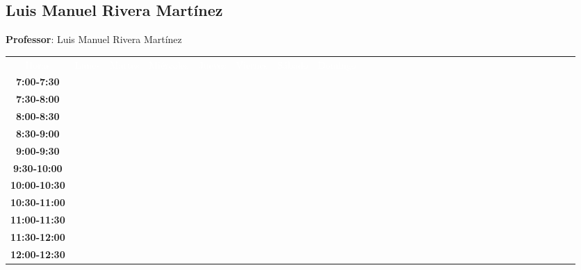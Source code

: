 \documentclass{article}
\begin{document}
        \newpage
        

        \subsection{Luis Manuel Rivera Mart\'inez}
        \vspace*{.1cm}
        
        \begin{flushright}
            {\LARGE \textbf{Professor}: Luis Manuel Rivera Mart\'inez}
        \end{flushright}
        \vspace{1cm}

        \begin{table}[ht]\centering\small\begin{tabular}{|c|c|c|c|c|c|c|c|c|c|c|c|c|c|c|c|c|c|c|c|c|c|c|c|c|c|c|c|c|c|}\hline\cellcolor{black}\textcolor{white}{Horas} & \cellcolor{black}\textcolor{white}{Lunes} & \cellcolor{black}\textcolor{white}{Martes} & \cellcolor{black}\textcolor{white}{Mi\'ercoles} & \cellcolor{black}\textcolor{white}{Jueves} & \cellcolor{black}\textcolor{white}{Viernes} & \cellcolor{black}\textcolor{white}{S\'abado} & \cellcolor{black}\textcolor{white}{Domingo} \\
 \cline{1-8} 
\textbf{7:00-7:30} &   &   &   &   &   &   &   \\
 \cline{1-8} 
\textbf{7:30-8:00} &   &   &   &   &   &   &   \\
 \cline{1-8} 
\textbf{8:00-8:30} &   &   &   &   &   &   &   \\
 \cline{1-8} 
\textbf{8:30-9:00} &   &   &   &   &   &   &   \\
 \cline{1-8} 
\textbf{9:00-9:30} &   &   &   &   &   &   &   \\
 \cline{1-8} 
\textbf{9:30-10:00} &   &   &   &   &   &   &   \\
 \cline{1-8} 
\textbf{10:00-10:30} &   &   &   &   &   &   &   \\
 \cline{1-8} 
\textbf{10:30-11:00} &   &   &   &   &   &   &   \\
 \cline{1-8} 
\textbf{11:00-11:30} &   &   &   &   &   &   &   \\
 \cline{1-8} 
\textbf{11:30-12:00} &   & \cellcolor[RGB]{199,83,77} & \cellcolor[RGB]{199,83,77} &   &   &   &   \\
 \cline{1-2} \cline{5-8} 
\textbf{12:00-12:30} & \cellcolor[RGB]{199,83,77} & \cellcolor[RGB]{199,83,77} & \cellcolor[RGB]{199,83,77} &   &   &   &   \\

\end{tabular}
\end{table}
\end{document}
